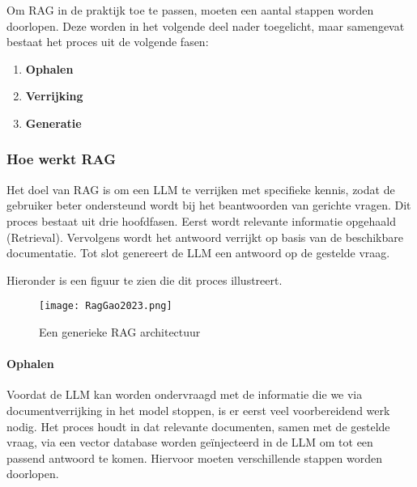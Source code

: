     Om RAG in de praktijk toe te passen, moeten een aantal stappen worden doorlopen. Deze worden in het volgende deel nader toegelicht, maar samengevat bestaat het proces uit de volgende fasen:
    
    \begin{enumerate}
        \item \textbf{Ophalen}
        \item \textbf{Verrijking}
        \item \textbf{Generatie}
    \end{enumerate}
    
    \subsubsection{Hoe werkt RAG}
    
    Het doel van RAG is om een LLM te verrijken met specifieke kennis, zodat de gebruiker beter ondersteund wordt bij het beantwoorden van gerichte vragen. Dit proces bestaat uit drie hoofdfasen. Eerst wordt relevante informatie opgehaald (Retrieval). Vervolgens wordt het antwoord verrijkt op basis van de beschikbare documentatie. Tot slot genereert de LLM een antwoord op de gestelde vraag.
    
    Hieronder is een figuur te zien die dit proces illustreert.
    
    \begin{figure}[H]
        \centering
        \texttt{[image: RagGao2023.png]}
        \caption{Een generieke RAG architectuur \cite{Gao2023}}
        \label{fig:Rag process}
    \end{figure}
    
    \paragraph{Ophalen}
   
    
    Voordat de LLM kan worden ondervraagd met de informatie die we via documentverrijking in het model stoppen, is er eerst veel voorbereidend werk nodig. Het proces houdt in dat relevante documenten, samen met de gestelde vraag, via een vector database worden geïnjecteerd in de LLM om tot een passend antwoord te komen. Hiervoor moeten verschillende stappen worden doorlopen.
    
